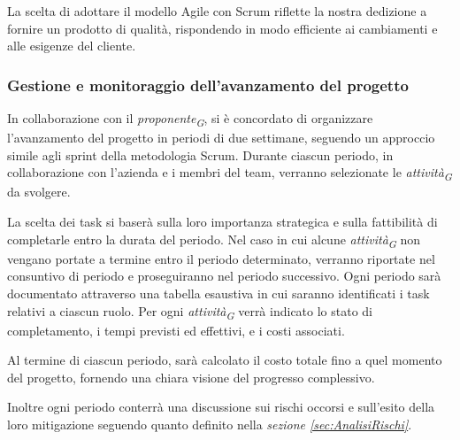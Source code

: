 La scelta di adottare il modello Agile con Scrum riflette la nostra dedizione a fornire un prodotto di qualità, rispondendo in modo efficiente ai cambiamenti e alle esigenze del cliente.

\pagebreak

\subsubsection{Gestione e monitoraggio dell'avanzamento del progetto}
In collaborazione con il \textit{proponente}\textsubscript{\textit{G}}, si è concordato di organizzare l'avanzamento del progetto in periodi di due settimane, seguendo un approccio simile agli sprint della metodologia Scrum. Durante ciascun periodo, in collaborazione con l'azienda e i membri del team, verranno selezionate le \textit{attività}\textsubscript{\textit{G}} da svolgere.

\vspace{0.2cm}

La scelta dei task si baserà sulla loro importanza strategica e sulla fattibilità di completarle entro la durata del periodo. Nel caso in cui alcune \textit{attività}\textsubscript{\textit{G}} non vengano portate a termine entro il periodo determinato, verranno riportate nel consuntivo di periodo e proseguiranno nel periodo successivo.
Ogni periodo sarà documentato attraverso una tabella esaustiva in cui saranno identificati i task relativi a ciascun ruolo. Per ogni \textit{attività}\textsubscript{\textit{G}} verrà indicato lo stato di completamento, i tempi previsti ed effettivi, e i costi associati.

\vspace{0.2cm}



Al termine di ciascun periodo, sarà calcolato il costo totale fino a quel momento del progetto, fornendo una chiara visione del progresso complessivo.

Inoltre ogni periodo conterrà una discussione sui rischi occorsi e sull'esito della loro mitigazione seguendo quanto definito nella \textit{sezione \ref{sec:AnalisiRischi}}.

